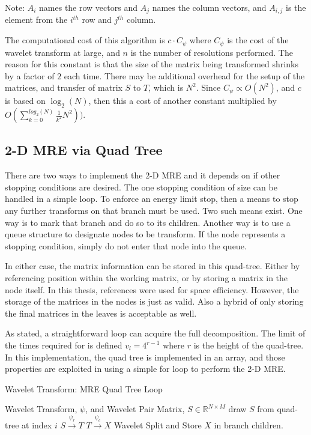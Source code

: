 Note: $A_i$ names the row vectors and $A_j$ names the column vectors, and $A_{i,j}$ is the element from the $i^{th}$ row and $j^{th}$ column.

The computational cost of this algorithm is $c \cdot C_\psi$  where $C_\psi$ is the cost of the wavelet transform at large, and $n$ is the number of resolutions performed.  The reason for this constant is that the size of the matrix being transformed shrinks by a factor of $2$ each time.  There may be additional overhead for the setup of the matrices, and transfer of matrix $S$ to $T$, which is $N^2$.  Since $C_\psi \propto O(N^2)$, and $c$ is based on $\log_2(N)$, then this a cost of another constant multiplied by $O(\sum\limits_{k=0}^{log_2(N)} \frac{1}{k^2}N^2))$.

\subsection {2-D MRE via Quad Tree}
There are two ways to implement the 2-D MRE and it depends on if other stopping conditions are desired.  The one stopping condition of size can be handled in a simple loop.  To enforce an energy limit stop, then a means to stop any further transforms on that branch must be used.   Two such means exist.   One way is to mark that branch and do so to its children.  Another way is to use a queue structure to designate nodes to be transform.  If the node represents a stopping condition, simply do not enter that node into the queue. 

In either case, the matrix information can be stored in this quad-tree.  Either by referencing position within the working matrix, or by storing a matrix in the node itself.  In this thesis, references were used for space efficiency.  However, the storage of the matrices in the nodes is just as valid.  Also a hybrid of only storing the final matrices in the leaves is acceptable as well.  

As stated, a straightforward loop can acquire the full decomposition.  The limit of the times required for is defined $v_l = 4^{r-1} $  where $r$ is the height of the quad-tree.  In this implementation, the quad tree is implemented in an array, and those properties are exploited in using a simple for loop to perform the 2-D MRE.
\begin{algorithm}
\caption{Wavelet Transform: MRE Quad Tree Loop }
\label{mreqtloop}
\begin{algorithmic}
\REQUIRE Wavelet Transform, $\psi$, and Wavelet Pair
\REQUIRE Matrix, $S \in {\mathbb R}^{N\times M}$
\STATE draw $S$ from quad-tree at index $i$
\STATE $S \stackrel{\psi_r}{\to} T$
\STATE $T \stackrel{\psi_c}{\to} X$
\STATE Wavelet Split and Store $X$ in branch children.
\ENDFOR
\end{algorithmic}
\end{algorithm}

